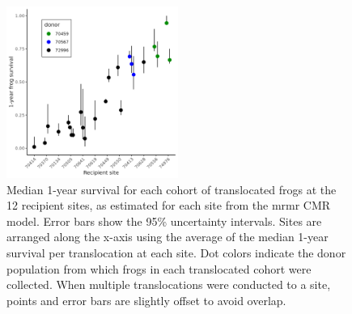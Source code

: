 \documentclass[9pt,twocolumn,twoside,lineno]{pnas-new}
\begin{document}
\newpage

\begin{figure}

{\centering \includegraphics[width=0.5\textwidth]{figures/translocation_survival_bysiteid.png}

}

\caption{\label{fig-translocation-survival}Median 1-year survival for
each cohort of translocated frogs at the 12 recipient sites, as
estimated for each site from the mrmr CMR model. Error bars show the
95\% uncertainty intervals. Sites are arranged along the x-axis using
the average of the median 1-year survival per translocation at each
site. Dot colors indicate the donor population from which frogs in each
translocated cohort were collected. When multiple translocations were
conducted to a site, points and error bars are slightly offset to avoid
overlap.}

\end{figure}

\newpage
\end{document}
